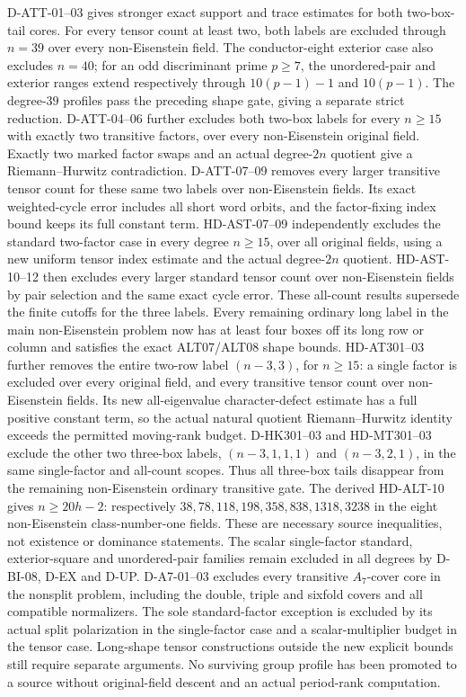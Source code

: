 \documentclass[11pt]{article}
\theoremstyle{remark}\newtheorem{remark}[theorem]{Remark}
\begin{document}
D-ATT-01--03 gives stronger exact support and trace estimates for both
two-box-tail cores. For every tensor count at least two, both labels
are excluded through $n=39$ over every non-Eisenstein field. The
conductor-eight exterior case also excludes $n=40$; for an odd
discriminant prime $p\ge7$, the unordered-pair and exterior ranges
extend respectively through $10(p-1)-1$ and $10(p-1)$.
The degree-$39$ profiles pass the preceding shape gate, giving a
separate strict reduction. D-ATT-04--06 further excludes both
two-box labels for every $n\ge15$ with exactly two transitive factors,
over every non-Eisenstein original field. Exactly two marked factor
swaps and an actual degree-$2n$ quotient give a Riemann--Hurwitz
contradiction. D-ATT-07--09 removes every larger transitive
tensor count for these same two labels over non-Eisenstein fields.
Its exact weighted-cycle error includes all short word orbits, and
the factor-fixing index bound keeps its full constant term.
HD-AST-07--09 independently excludes the standard two-factor case
in every degree $n\ge15$, over all original fields, using a new
uniform tensor index estimate and the actual degree-$2n$ quotient.
HD-AST-10--12 then excludes every larger standard tensor count
over non-Eisenstein fields by pair selection and the same exact
cycle error. These all-count results supersede the finite cutoffs
for the three labels. Every remaining ordinary long label in the
main non-Eisenstein problem now has at least four boxes off its long
row or column and satisfies the exact ALT07/ALT08 shape bounds.
HD-AT301--03 further removes the entire two-row label $(n-3,3)$,
for $n\ge15$: a single factor is excluded over every original
field, and every transitive tensor count over non-Eisenstein fields.
Its new all-eigenvalue character-defect estimate has a full positive
constant term, so the actual natural quotient Riemann--Hurwitz
identity exceeds the permitted moving-rank budget.
D-HK301--03 and HD-MT301--03 exclude the other two three-box
labels, $(n-3,1,1,1)$ and $(n-3,2,1)$, in the same single-factor
and all-count scopes. Thus all three-box tails disappear from
the remaining non-Eisenstein ordinary transitive gate.
The derived HD-ALT-10 gives $n\ge20h-2$: respectively
$38,78,118,198,358,838,1318,3238$ in the eight non-Eisenstein
class-number-one fields. These are necessary source inequalities,
not existence or dominance statements.
The scalar single-factor
standard, exterior-square and unordered-pair families remain excluded
in all degrees by D-BI-08, D-EX and D-UP. D-A7-01--03 excludes
every transitive $A_7$-cover core in the nonsplit problem, including
the double, triple and sixfold covers and all compatible normalizers.
The sole standard-factor exception is excluded by its actual split
polarization in the single-factor case and a scalar-multiplier budget
in the tensor case. Long-shape tensor constructions outside the
new explicit bounds still require separate arguments. No surviving group profile has been promoted to a source
without original-field descent and an actual period-rank computation.
\end{document}
